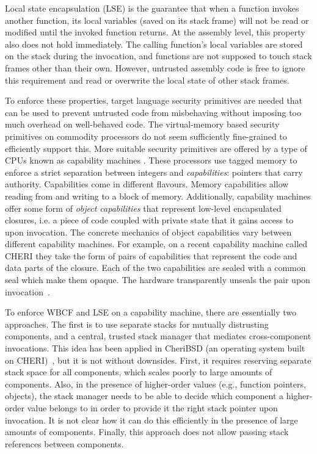 \documentclass[acmsmall,screen]{acmart}\settopmatter{}
\begin{document}
Local state encapsulation (LSE) is the guarantee that when a function invokes another function, its local variables (saved on its stack frame) will not be read or modified until the invoked function returns.
At the assembly level, this property also does not hold immediately.
The calling function's local variables are stored on the stack during the invocation, and functions are not supposed to touch stack frames other than their own.
However, untrusted assembly code is free to ignore this requirement and read or overwrite the local state of other stack frames.

To enforce these properties, target language security primitives are needed that can be used to prevent untrusted code from misbehaving without imposing too much overhead on well-behaved code.
The virtual-memory based security primitives on commodity processors do not seem sufficiently fine-grained to efficiently support this.
More suitable security primitives are offered by a type of CPUs known as capability machines \citep{levy_capability-based_1984,watson_cheri_2015}.
These processors use tagged memory to enforce a strict separation between integers and {\itshape capabilities}: pointers that carry authority.
Capabilities come in different flavours.
Memory capabilities allow reading from and writing to a block of memory.
Additionally, capability machines offer some form of {\itshape object capabilities} that represent low-level encapsulated closures, i.e. a piece of code coupled with private state that it gains access to upon invocation.
The concrete mechanics of object capabilities vary between different capability machines.
For example, on a recent capability machine called CHERI they take the form of pairs of capabilities that represent the code and data parts of the closure.
Each of the two capabilities are sealed with a common seal which make them opaque.
The hardware transparently unseals the pair upon invocation~\citep{watson_capability_2015,watson_fast_2016}.

To enforce WBCF and LSE on a capability machine, there are essentially two approaches.
The first is to use separate stacks for mutually distrusting components, and a central, trusted stack manager that mediates cross-component invocations.
This idea has been applied in CheriBSD (an operating system built on CHERI)~\citep{watson_capability_2015}, but it is not without downsides.
First, it requires reserving separate stack space for all components, which scales poorly to large amounts of components.
Also, in the presence of higher-order values (e.g., function pointers, objects), the stack manager needs to be able to decide which component a higher-order value belongs to in order to provide it the right stack pointer upon invocation.
It is not clear how it can do this efficiently in the presence of large amounts of components.
Finally, this approach does not allow passing stack references between components.
\end{document}
